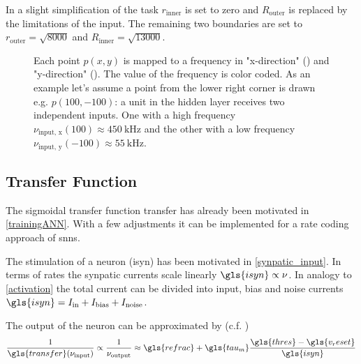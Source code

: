 In a slight simplification of the task $r_{\text{inner}}$ is set to zero and $R_{\text{outer}}$ is replaced by the limitations of the input. The remaining two boundaries are set to $r_{\text{outer}} = \sqrt{8000}$ and $R_{\text{inner}} = \sqrt{13000}$.

\begin{figure}
	\begin{subfigure}[c]{0.5\textwidth}
		\centering
		\caption{}
		\label{nuxinput}
	\end{subfigure}
	\begin{subfigure}[c]{0.5\textwidth}
		\centering
		\caption{}
		\label{nuyinput}
	\end{subfigure}
	\caption{Each point $p(x,y)$ is mapped to a frequency in "x-direction" () and "y-direction" (). The value of the frequency is color coded. As an example let's assume a point from the lower right corner is drawn e.g. $p(100,-100)$: a unit in the hidden layer receives two independent inputs. One with a high frequency $\nu_{\text{input, x}}(100) \approx \SI{450}{\kilo \Hz}$ and the other with a low frequency $\nu_{\text{input, y}}(-100) \approx \SI{55}{\kilo \Hz}$.}

\end{figure}

\subsection{Transfer Function}

The sigmoidal transfer function \gls{transfer} has already been motivated in \cref{trainingANN}. With a few adjustments it can be implemented for a rate coding approach of \glspl{snn}.

The stimulation of a neuron (\gls{isyn}) has been motivated in \cref{synpatic_input}. In terms of rates the synpatic currents scale linearly $\gls{isyn} \propto \nu$. In analogy to \cref{activation} the total current can be divided into input, bias and noise currents $\gls{isyn} = I_\text{in} + I_\text{bias} + I_\text{noise}$.

The output of the neuron can be approximated by (c.f. \cite{brunel2000dynamics})
\begin{equation}\label{fireratehigh}
\frac{1}{\gls{transfer}(\nu_\text{input})} \propto \frac{1}{\nu_\text{output}} \approx \gls{refrac} + \gls{tau_m} \frac{\gls{thres} - \gls{v_reset}}{\gls{isyn}}
\end{equation}

